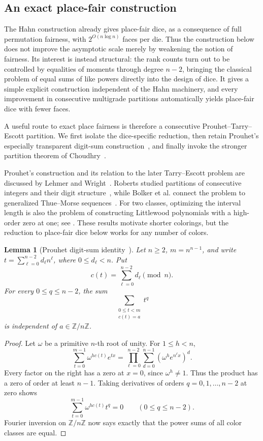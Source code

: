 \documentclass[11pt]{article}
\newtheorem{lemma}[theorem]{Lemma}
\theoremstyle{definition}
\theoremstyle{remark}
\begin{document}
\subsection{An exact place-fair construction}

The Hahn construction already gives place-fair dice, as a consequence of
full permutation fairness, with \(2^{O(n\log n)}\) faces per die.  Thus the
construction below does not improve the asymptotic scale merely by weakening
the notion of fairness.  Its interest is instead structural: the rank counts
turn out to be controlled by equalities of moments through degree \(n-2\),
bringing the classical problem of equal sums of like powers directly into
the design of dice.  It gives a simple explicit construction independent of
the Hahn machinery, and every improvement in consecutive multigrade
partitions automatically yields place-fair dice with fewer faces.

A useful route to exact place fairness is therefore a consecutive
Prouhet--Tarry--Escott partition.  We first isolate the dice-specific
reduction, then retain Prouhet's especially transparent digit-sum
construction~\cite{prouhet1851}, and finally invoke the stronger partition
theorem of Choudhry~\cite{choudhry2020}.

Prouhet's construction and its relation to the later Tarry--Escott problem
are discussed by Lehmer and Wright~\cite{lehmer1947,wright1949,wright1959}.
Roberts studied partitions of consecutive integers and their digit
structure~\cite{roberts1964a,roberts1964b}, while Bolker et al. connect the
problem to generalized Thue--Morse sequences~\cite{bolker-et-al2016}.
For two classes, optimizing the interval length is also the problem of
constructing Littlewood polynomials with a high-order zero at one; see
\cite{boyd1997,boyd2002,berend-golan2006,buhler-et-al2021}.  These results
motivate shorter colorings, but the reduction to place-fair dice below works
for any number of colors.

\begin{lemma}[Prouhet digit-sum identity~\cite{prouhet1851}]\label{lem:prouhet}
Let \(n\geq2\), \(m=n^{n-1}\), and write
\(t=\sum_{\ell=0}^{n-2}d_\ell n^\ell\), where
\(0\leq d_\ell<n\).  Put
\[
  c(t)=\sum_{\ell=0}^{n-2}d_\ell\pmod n.
\]
For every \(0\leq q\leq n-2\), the sum
\[
  \sum_{\substack{0\leq t<m\\c(t)=a}}t^q
\]
is independent of \(a\in\mathbb Z/n\mathbb Z\).
\end{lemma}

\begin{proof}
Let \(\omega\) be a primitive \(n\)-th root of unity.  For
\(1\leq h<n\),
\[
  \sum_{t=0}^{m-1}\omega^{hc(t)}e^{tx}
  =\prod_{\ell=0}^{n-2}
    \sum_{d=0}^{n-1}(\omega^he^{n^\ell x})^d.
\]
Every factor on the right has a zero at \(x=0\), since \(\omega^h\neq1\).
Thus the product has a zero of order at least \(n-1\).  Taking derivatives
of orders \(q=0,1,\ldots,n-2\) at zero shows
\[
  \sum_{t=0}^{m-1}\omega^{hc(t)}t^q=0
  \qquad(0\leq q\leq n-2).
\]
Fourier inversion on \(\mathbb Z/n\mathbb Z\) now says exactly that the
power sums of all color classes are equal.
\end{proof}
\end{document}
